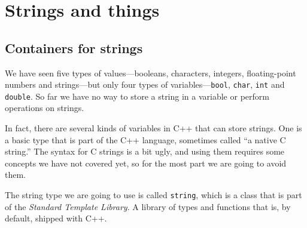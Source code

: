





\chapter{Strings and things}
\label{strings}

\section{Containers for strings}

We have seen five types of values---booleans, characters, integers,
floating-point numbers and strings---but only four types of
variables---{\tt bool}, {\tt char}, {\tt int} and {\tt double}.  So
far we have no way to store a string in a variable or perform
operations on strings.

In fact, there are several kinds of variables in C++ that
can store strings.  One is a basic type that is part of the C++
language, sometimes called ``a native C string.''  The syntax
for C strings is a bit ugly, and using them requires some concepts
we have not covered yet, so for the most part we are going to
avoid them.

The string type we are going to use is called {\tt string}, which is a class that is
part of the \textit{Standard Template Library}.  A library of types and functions that is, by default, shipped with C++.

